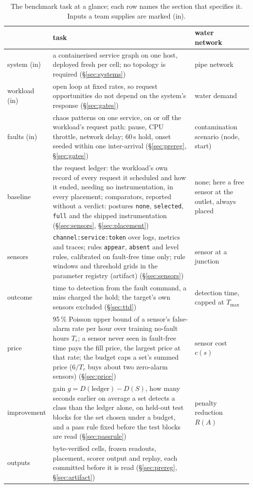 \documentclass{ceurart}
\newcommand{\nv}{\textemdash}
\begin{document}
\begin{table}[t]
\caption{The benchmark task at a glance; each row names the section that specifies it. Inputs a team supplies are marked (in).}
\label{tab:task}
\footnotesize
\begin{tabular}{@{}p{}p{}p{}@{}}
\toprule
 & task & water network~\cite{leskovec_cost-effective_2007} \\
\midrule
system (in) & a containerised service graph on one host, deployed fresh per cell; no topology is required (\S\ref{sec:systems}) & pipe network \\
workload (in) & open loop at fixed rates, so request opportunities do not depend on the system's response (\S\ref{sec:gates}) & water demand \\
faults (in) & chaos patterns on one service, on or off the workload's request path: pause, CPU throttle, network delay; 60\,s hold,
  onset seeded within one inter-arrival (\S\ref{sec:prereg}, \S\ref{sec:gates}) & contamination scenario (node, start) \\
baseline & the request ledger: the workload's own record of every request it scheduled and how it ended, needing no
  instrumentation, in every placement; comparators, reported without a verdict: postures \texttt{none}, \texttt{selected},
  \texttt{full} and the shipped instrumentation (\S\ref{sec:sensors}, \S\ref{sec:placement}) & none; here a free sensor at the outlet, always placed \\
sensors & \texttt{channel:service:token} over logs, metrics and traces; rules \texttt{appear}, \texttt{absent} and level rules,
  calibrated on fault-free time only; rule windows and threshold grids in the parameter registry (artifact) (\S\ref{sec:sensors}) & sensor at a junction \\
outcome & time to detection from the fault command, a miss charged the hold; the target's own sensors excluded (\S\ref{sec:ttd}) & detection time, capped at $T_{\max}$ \\
price & 95\,\% Poisson upper bound of a sensor's false-alarm rate per hour over training no-fault hours $T_r$; a sensor
  never seen in fault-free time pays the fill price, the largest price at that rate; the budget caps a set's summed price
  ($6/T_r$ buys about two zero-alarm sensors) (\S\ref{sec:price}) & sensor cost $c(s)$ \\
improvement & gain $g = D(\text{ledger}) - D(S)$, how many seconds earlier on average a set detects a class than the
  ledger alone, on held-out test blocks for the set chosen under a budget, and a pass rule fixed
  before the test blocks are read (\S\ref{sec:passrule}) & penalty reduction $R(A)$ \\
outputs & byte-verified cells, frozen readouts, placement, scorer output and replay, each committed before it is read
  (\S\ref{sec:prereg}, \S\ref{sec:artifact}) & \nv \\
\bottomrule
\end{tabular}
\end{table}
\end{document}
